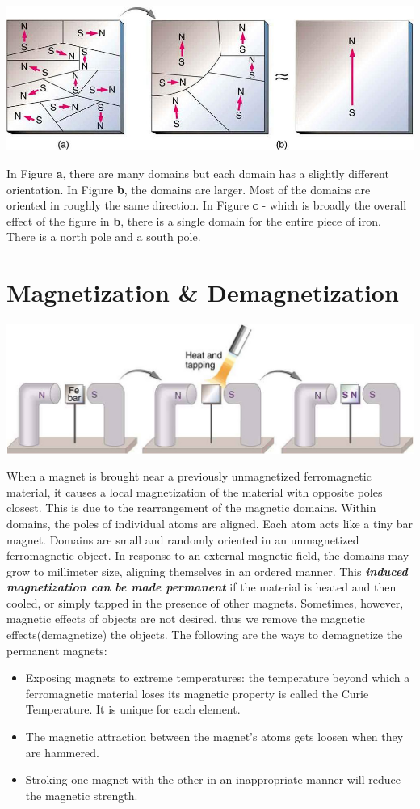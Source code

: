 \documentclass[9pt]{article}
\begin{document}
	\begin{center}
		\includegraphics[scale=0.2]{magnetic_domains}
	\end{center}
	In Figure \textbf{a}, there are many domains but each domain has a slightly different orientation. In Figure \textbf{b}, the domains are larger. Most of the domains are oriented in roughly the same direction. In Figure \textbf{c} - which is broadly the overall effect of the figure in \textbf{b}, there is a single domain for the entire piece of iron. There is a north pole and a south pole.
	\section*{Magnetization \& Demagnetization}
	\begin{center}
		\includegraphics[scale=0.3]{magnetization}
	\end{center}
	When a magnet is brought near a previously unmagnetized ferromagnetic material, it causes a local magnetization of the material with opposite poles closest. This is due to the rearrangement of the magnetic domains. Within domains, the poles of individual atoms are aligned. Each atom acts like a tiny bar magnet. Domains are small and randomly oriented in an unmagnetized ferromagnetic object. In response to an external magnetic field, the domains may grow to millimeter size, aligning themselves in an ordered manner. This \textit{\textbf{induced magnetization can be made permanent}} if the material is heated and then cooled, or simply tapped in the presence of other magnets. Sometimes, however, magnetic effects of objects are not desired, thus we remove the magnetic effects(demagnetize) the objects. The following are the ways to demagnetize the permanent magnets:
	\begin{itemize}
		\item Exposing magnets to extreme temperatures: the temperature beyond which a ferromagnetic material loses its magnetic property is called the Curie Temperature. It is unique for each element.
		\item The magnetic attraction between the magnet’s atoms gets loosen when they are hammered.
		\item Stroking one magnet with the other in an inappropriate manner will reduce the magnetic strength.
	\end{itemize} 
\end{document}
